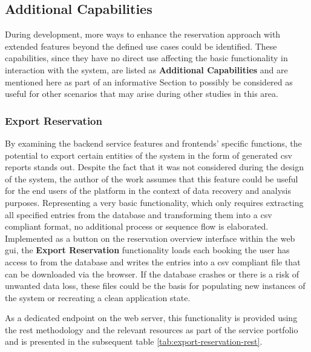 \subsection{Additional Capabilities}
\label{ch:Implementation:sec:Reservation System:ssec:Additional Capabilities}

During development, more ways to enhance the reservation approach with extended features beyond the defined use cases could be identified.
These capabilities, since they have no direct use affecting the basic functionality in interaction with the system, are listed as \textbf{Additional Capabilities} and are mentioned here as part of an informative Section to possibly be considered as useful for other scenarios that may arise during other studies in this area.

\subsubsection{Export Reservation}
\label{ch:Implementation:sec:Reservation System:ssec:Additional Capabilities:sssec:Export Reservation}

By examining the backend service features and frontends' specific functions, the potential to export certain entities of the system in the form of generated \acrshort{csv} reports stands out.
Despite the fact that it was not considered during the design of the system, the author of the work assumes that this feature could be useful for the end users of the platform in the context of data recovery and analysis purposes.
Representing a very basic functionality, which only requires extracting all specified entries from the database and transforming them into a \acrshort{csv} compliant format, no additional process or sequence flow is elaborated.
Implemented as a button on the reservation overview interface within the web \acrshort{gui}, the \textbf{Export Reservation} functionality loads each booking the user has access to from the database and writes the entries into a \acrshort{csv} compliant file that can be downloaded via the browser.
If the database crashes or there is a risk of unwanted data loss, these files could be the basis for populating new instances of the system or recreating a clean application state.

\noindent As a dedicated endpoint on the web server, this functionality is provided using the \acrshort{rest} methodology and the relevant resources as part of the service portfolio and is presented in the subsequent table \ref{tab:export-reservation-rest}.

